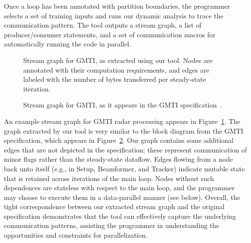 Once a loop has been annotated with partition boundaries, the
programmer selects a set of training inputs and runs our dynamic
analysis to trace the communication pattern.  The tool outputs a
stream graph, a list of producer/consumer statements, and a set of
communication macros for automatically running the code in parallel.

\begin{figure}[t!]
\centering
\hspace{0in}
\caption[Stream graph for GMTI, as extracted using our tool]{Stream
  graph for GMTI, as extracted using our tool.  Nodes are annotated
  with their computation requirements, and edges are labeled with the
  number of bytes transferred per steady-state
  iteration.\protect\label{fig:gmti-graph-tool}}
\end{figure}

\begin{figure}[t!]
\centering
\hspace{0in}
\caption[Stream graph for GMTI, as it appears in the GMTI
  specification]{Stream graph for GMTI, as it appears in the GMTI
  specification~\protect\cite{reuther03gmti}.\protect\label{fig:gmti-graph-spec}}
\vspace{-6pt}
\end{figure}

An example stream graph for GMTI radar processing appears in
Figure~\ref{fig:gmti-graph-tool}.  The graph extracted by our tool is
very similar to the block diagram from the GMTI specification, which
appears in Figure~\ref{fig:gmti-graph-spec}.  Our graph contains some
additional edges that are not depicted in the specification; these
represent communication of minor flags rather than the steady-state
dataflow.  Edges flowing from a node back unto itself (e.g., in Setup,
Beamformer, and Tracker) indicate mutable state that is retained
across iterations of the main loop.  Nodes without such dependences
are stateless with respect to the main loop, and the programmer may
choose to execute them in a data-parallel manner (see below).
Overall, the tight correspondence between our extracted stream graph
and the original specification demonstrates that the tool can
effectively capture the underlying communication patterns, assisting
the programmer in understanding the opportunities and constraints for
parallelization.

